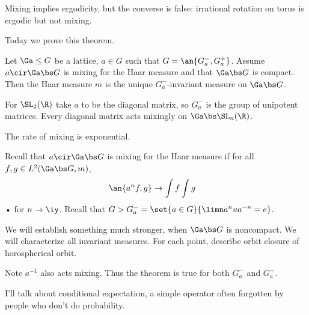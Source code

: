 

Mixing implies ergodicity, but the converse is false: irrational rotation on torus is ergodic but not mixing.

Today we prove this theorem.
\begin{thm}\label{thm:mix-hor}
Let $\Ga\le G$ be a lattice, $a\in G$ such that $G=\an{G_a^-,G_a^+}$. Assume $a\cir \Ga \bs G$ is mixing for the Haar measure and that $\Ga \bs G$ is compact. Then the Haar measure $m$ is the unique $G_a^-$-invariant measure on $\Ga\bs G$.
\end{thm}
For $\SL_2(\R)$ take $a$ to be the diagonal matrix, so $G_a^-$ is the group of unipotent matrices. Every diagonal matrix acts mixingly on $\Ga\bs \SL_n(\R)$.  

The rate of mixing is exponential.

Recall that $a\cir \Ga \bs G$ is mixing for the Haar measure if for all $f,g\in L^2(\Ga \bs G, m)$, 
\begin{align}
\an{a^n f,g} &\to \int f \int g
\end{align}•
for $n\to \iy$. Recall that $G>G_a^- = \set{a\in G}{\limn a^n ua^{-n}=e}$.

We will establish something much stronger, when $\Ga\bs G$ is noncompact. We will characterize all invariant measures. For each point, describe orbit closure of horospherical orbit. 

Note $a^{-1}$ also acts mixing. Thus the theorem is true for both $G_a^-$ and $G_a^+$.

I'll talk about conditional expectation, a simple operator often forgotten by people who don't do probability.

